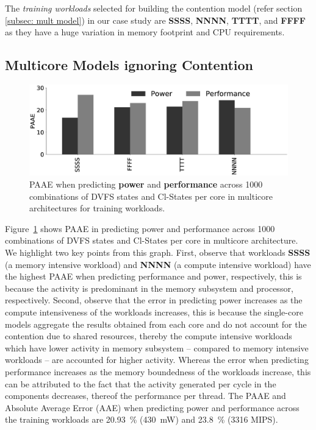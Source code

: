 The \textit{training workloads} selected for building the contention model (refer section
\ref{subsec: mult model}) in our case study are \textbf{SSSS}, \textbf{NNNN},
\textbf{TTTT}, and \textbf{FFFF} as they have a huge variation in memory footprint and CPU
requirements. 


\subsection{Multicore Models ignoring Contention} 
\label{subsubsection: no-contention}

\begin{figure}[tb!]
   \centering
    \includegraphics[width=\textwidth]{Chapter3/Figs/no-contention/without-contention-paae.eps}
    \caption[PAAE ignoring contention for shared resources]{ PAAE when predicting \textbf{power} and \textbf{performance} across 1000 combinations of DVFS states and Cl-States per core in multicore architectures for training workloads.} 
    \label{fig: power perf prediction multicore paae}
\end{figure}


Figure~\ref{fig: power perf prediction multicore paae} shows PAAE in predicting power and
performance across 1000 combinations of DVFS states and Cl-States per core in multicore
architecture. We highlight two key points from this graph. First, observe that workloads
\textbf{SSSS} (a memory intensive workload) and \textbf{NNNN} (a compute intensive
workload) have the highest PAAE when predicting performance and power, respectively, this
is because the activity is predominant in the memory subsystem and processor,
respectively. Second, observe that the error in predicting power increases as the compute
intensiveness of the workloads increases, this is because the single-core models aggregate
the results obtained from each core and do not account for the contention due to shared
resources, thereby the compute intensive workloads which have lower activity in memory
subsystem -- compared to memory intensive workloads -- are accounted for higher activity.
Whereas the error when predicting performance increases as the memory boundedness of the
workloads increase, this can be attributed to the fact that the activity generated per
cycle in the components decreases, thereof the performance per thread. The PAAE and
Absolute Average Error (AAE) when predicting power and performance across the training
workloads are \SI{20.93}{\percent} (\SI{430}{\milli\watt}) and \SI{23.8}{\percent} (3316
MIPS).




 


